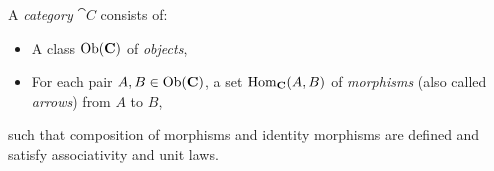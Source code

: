 
\begin{definition}
A \emph{category} \( \cat{C} \) consists of:
\begin{itemize}[nosep]
  \item A class \( \mathrm{Ob}(\mathbf{C}) \) of \emph{objects},
  \item For each pair \( A, B \in \mathrm{Ob}(\mathbf{C}) \), a set \( \mathrm{Hom}_{\mathbf{C}}(A, B) \) of \emph{morphisms} (also called \emph{arrows}) from \( A \) to \( B \),
\end{itemize}
such that composition of morphisms and identity morphisms are defined and satisfy associativity and unit laws.
\end{definition}

